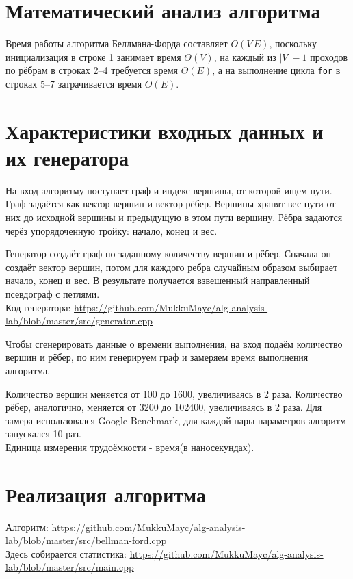 \documentclass[a4paper,12pt]{article}
\begin{document}
\section{Математический анализ алгоритма}
  Время работы алгоритма Беллмана-Форда составляет $O(V\,E)$, поскольку
  инициализация в строке 1 занимает время $\Theta(V)$, на каждый из $|V| - 1$ 
  проходов по рёбрам в строках 2--4 требуется время $\Theta(E)$, а на выполнение цикла
  \texttt{for} в строках 5--7 затрачивается время $O(E)$.\cite[с.~689-690]{cormen}

\section{Характеристики входных данных и их генератора}
На вход алгоритму поступает граф и индекс вершины, от которой ищем пути.
Граф задаётся как вектор вершин и вектор рёбер.
Вершины хранят вес пути от них до исходной вершины и предыдущую в этом пути вершину.
Рёбра задаются черёз упорядоченную тройку: начало, конец и вес.

Генератор создаёт граф по заданному количеству вершин и рёбер.
Сначала он создаёт вектор вершин, потом для каждого ребра случайным образом 
выбирает начало, конец и вес.
В результате получается взвешенный направленный псевдограф с петлями. \\
Код генератора: \url{https://github.com/MukkuMayc/alg-analysis-lab/blob/master/src/generator.cpp}

Чтобы сгенерировать данные о времени выполнения, 
на вход подаём количество вершин и рёбер, по ним генерируем граф 
и замеряем время выполнения алгоритма.

Количество вершин меняется от 100 до 1600, увеличиваясь в 2 раза.
Количество рёбер, аналогично, меняется от 3200 до 102400, увеличиваясь в 2 раза.
Для замера использовался Google Benchmark, для каждой пары параметров 
алгоритм запускался 10 раз. \\
Единица измерения трудоёмкости - время(в наносекундах).
\section{Реализация алгоритма}
Алгоритм:
\url{https://github.com/MukkuMayc/alg-analysis-lab/blob/master/src/bellman-ford.cpp} \\
Здесь собирается статистика:
\url{https://github.com/MukkuMayc/alg-analysis-lab/blob/master/src/main.cpp}
\end{document}
